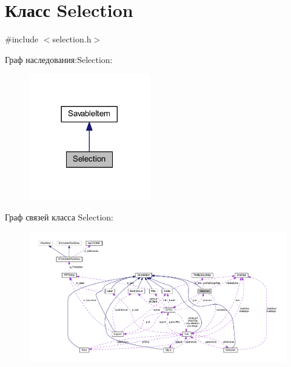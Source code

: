 \hypertarget{class_selection}{\section{Класс Selection}
\label{class_selection}
}


{\ttfamily \#include $<$selection.\-h$>$}



Граф наследования\-:Selection\-:
\nopagebreak
\begin{figure}[H]
\begin{center}
\leavevmode
\includegraphics[width=149pt]{class_selection__inherit__graph}
\end{center}
\end{figure}


Граф связей класса Selection\-:
\nopagebreak
\begin{figure}[H]
\begin{center}
\leavevmode
\includegraphics[width=350pt]{class_selection__coll__graph}
\end{center}
\end{figure}
